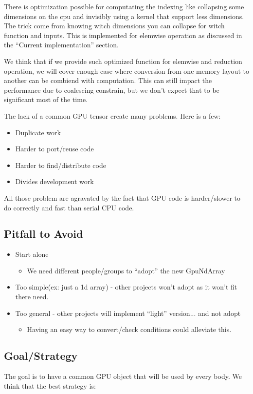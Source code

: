 \documentclass{article} %
\begin{document}
There is optimization possible for computating the indexing like
collapsing some dimensions on the cpu and invisibly using a kernel
that support less dimensions. The trick come from knowing witch
dimensions you can collapse for witch function and inputs. This is
implemented for elemwise operation as discussed in the ``Current
implementation'' section.

We think that if we provide such optimized function for elemwise and
reduction operation, we will cover enough case where conversion from
one memory layout to another can be combiend with computation. This
can still impact the performance due to coalescing constrain, but we
don't expect that to be significant most of the time.


The lack of a common GPU tensor create many problems. Here is a few:
\begin{itemize}
  \item Duplicate work
  \item Harder to port/reuse code
  \item Harder to find/distribute code
  \item Divides development work
\end{itemize}

All those problem are agravated by the fact that GPU code is
harder/slower to do correctly and fast than serial CPU code.

\subsection{Pitfall to Avoid}
\begin{itemize}
\item Start alone
  \begin{itemize}
  \item We need different people/groups to ``adopt'' the new GpuNdArray
  \end{itemize}
\item Too simple(ex: just a 1d array) - other projects won't adopt as it won't fit there need.
\item Too general - other projects will implement ``light'' version... and not adopt
  \begin{itemize}
  \item Having an easy way to convert/check conditions could alleviate this.
  \end{itemize}
\end{itemize}

\subsection{Goal/Strategy}
The goal is to have a common GPU object that will be used by every body. We think that the best strategy is:
\end{document}

